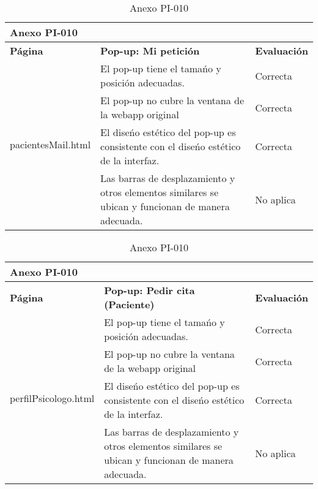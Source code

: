 \begin{table}[htpb]
\centering
\begin{tabularx}{\textwidth}{|l|X|l|}
\hline
\multicolumn{3}{|l|}{\textbf{Anexo PI-010}}                                                                                                                     \\ \hline
\textbf{Página}                     & \textbf{Pop-up: Mi petición}                                                                       & \textbf{Evaluación} \\ \hline
\multirow{4}{*}{pacientesMail.html} & El pop-up tiene el tamańo y posición adecuadas.                                                    & Correcta            \\ \cline{2-3} 
                                    & El pop-up no cubre la ventana de la webapp original                                                & Correcta            \\ \cline{2-3} 
                                    & El diseńo estético del pop-up es consistente con el diseńo estético de la interfaz.                & Correcta            \\ \cline{2-3} 
                                    & Las barras de desplazamiento y otros elementos similares se ubican y funcionan de manera adecuada. & No aplica           \\ \hline
\end{tabularx}
\caption{Anexo PI-010}
\end{table}


\begin{table}[htpb]
\centering
\begin{tabularx}{\textwidth}{|l|X|l|}
\hline
\multicolumn{3}{|l|}{\textbf{Anexo PI-010}}                                                                                                                       \\ \hline
\textbf{Página}                       & \textbf{Pop-up: Pedir cita (Paciente)}                                                             & \textbf{Evaluación} \\ \hline
\multirow{4}{*}{perfilPsicologo.html} & El pop-up tiene el tamańo y posición adecuadas.                                                    & Correcta            \\ \cline{2-3} 
                                      & El pop-up no cubre la ventana de la webapp original                                                & Correcta            \\ \cline{2-3} 
                                      & El diseńo estético del pop-up es consistente con el diseńo estético de la interfaz.                & Correcta            \\ \cline{2-3} 
                                      & Las barras de desplazamiento y otros elementos similares se ubican y funcionan de manera adecuada. & No aplica           \\ \hline
\end{tabularx}
\caption{Anexo PI-010}
\end{table}



